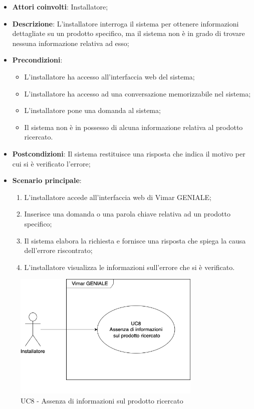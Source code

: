 \begin{itemize}
    \item \textbf{Attori coinvolti}: Installatore;
    \item \textbf{Descrizione}: L’installatore interroga il sistema per ottenere informazioni dettagliate su un prodotto specifico, ma il sistema non è in grado di trovare nessuna informazione relativa ad esso;
    \item \textbf{Precondizioni}: 
        \begin{itemize}
            \item L’installatore ha accesso all’interfaccia web del sistema;
            \item L’installatore ha accesso ad una conversazione memorizzabile nel sistema;
            \item L’installatore pone una domanda al sistema;
            \item Il sistema non è in possesso di alcuna informazione relativa al prodotto ricercato.
        \end{itemize}
    \item \textbf{Postcondizioni}: Il sistema restituisce una risposta che indica il motivo per cui si è verificato l’errore;
    \item \textbf{Scenario principale}:
    \begin{enumerate}
    \item L’installatore accede all’interfaccia web di Vimar GENIALE;
    \item Inserisce una domanda o una parola chiave relativa ad un prodotto specifico;
    \item Il sistema elabora la richiesta e fornisce una risposta che spiega la causa dell'errore riscontrato;
    \item L’installatore visualizza le informazioni sull’errore che si è verificato.
    \end{enumerate}
\end{itemize}
\begin{figure}[H]
\centering
\includegraphics[width=0.8\textwidth]{contents/casi_duso/png/UC8.png}
\caption{UC8 - Assenza di informazioni sul prodotto ricercato}
\end{figure}


